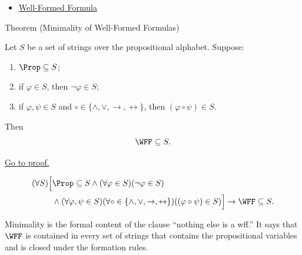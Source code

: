 \begin{dependencies}
\begin{itemize}
  \item \hyperref[def:well-formed-formula]{Well-Formed Formula}
\end{itemize}
\end{dependencies}
\begin{theorembox}{Theorem (Minimality of Well-Formed Formulas)}
\begin{theorem}
\label{thm:minimality-of-well-formed-formulas}
Let \(S\) be a set of strings over the propositional alphabet. Suppose:
\begin{enumerate}
  \item \(\Prop\subseteq S\);
  \item if \(\varphi\in S\), then \(\neg\varphi\in S\);
  \item if \(\varphi,\psi\in S\) and
        \(\circ\in\{\land,\lor,\to,\leftrightarrow\}\), then
        \((\varphi\circ\psi)\in S\).
\end{enumerate}
Then
\[
\WFF\subseteq S.
\]

\noindent\hyperref[prf:minimality-of-well-formed-formulas]{Go to proof.}
\end{theorem}
\end{theorembox}
\begin{remark*}
\[
\begin{aligned}
(\forall S)\Big[
&\Prop\subseteq S
\land
(\forall\varphi\in S)(\neg\varphi\in S)\\
&\land
(\forall\varphi,\psi\in S)
(\forall\circ\in\{\land,\lor,\to,\leftrightarrow\})
((\varphi\circ\psi)\in S)
\Big]
\to
\WFF\subseteq S.
\end{aligned}
\]
\end{remark*}




\begin{remark*}[Interpretation]
Minimality is the formal content of the clause ``nothing else is a wff.'' It says
that \(\WFF\) is contained in every set of strings that contains the
propositional variables and is closed under the formation rules.
\end{remark*}

